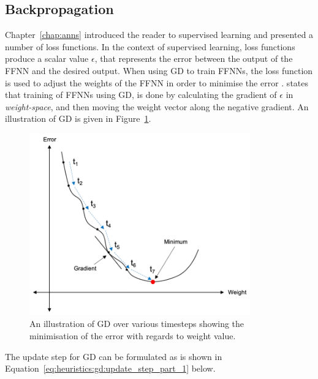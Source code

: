 \subsection{Backpropagation}\label{sec:heuristics:gd:backpropagation}

Chapter~\ref{chap:anns} introduced the reader to supervised learning and presented a number of loss functions. In the context of supervised learning, loss functions produce a scalar value $\epsilon$, that represents the error between the output of the \ac{FFNN} and the desired output. When using \acs{GD} to train \acp{FFNN}, the loss function is used to adjust the weights of the \ac{FFNN} in order to minimise the error \cite{ref:engelbrecht:2007}. \citeauthor{ref:engelbrecht:2007} \cite{ref:engelbrecht:2007} states that training of \acp{FFNN} using \acs{GD}, is done by calculating the gradient of $\epsilon$ in \textit{weight-space}, and then moving the weight vector along the negative gradient. An illustration of \acs{GD} is given in Figure~\ref{fig:heuristics:gd:gd_illustration}.

\begin{figure}[htbp]
      \centering
      \includegraphics[width=0.85\textwidth]{images/gradient_descent.pdf}
      \caption{An illustration of \ac{GD} over various timesteps showing the minimisation of the error with regards to weight value.}
      \label{fig:heuristics:gd:gd_illustration}
\end{figure}

\noindent
The update step for \ac{GD} can be formulated as is shown in Equation~\eqref{eq:heuristics:gd:update_step_part_1} below.

